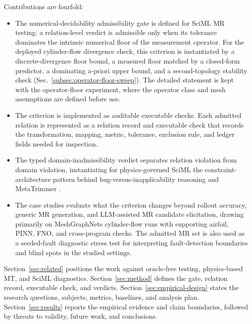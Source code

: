\documentclass[preprint,12pt]{elsarticle}
\begin{document}
Contributions are fourfold:
\begin{itemize}[leftmargin=*]
\item The numerical-decidability admissibility gate is defined for SciML MR testing: a relation-level verdict is admissible only when its tolerance dominates the intrinsic numerical floor of the measurement operator. For the deployed cylinder-flow divergence check, this criterion is instantiated by a discrete-divergence floor bound, a measured floor matched by a closed-form predictor, a dominating a-priori upper bound, and a second-topology stability check (Sec.~\ref{subsec:operator-floor-sweep}). The detailed statement is kept with the operator-floor experiment, where the operator class and mesh assumptions are defined before use.

\item The criterion is implemented as auditable executable checks. Each admitted relation is represented as a relation record and executable check that records the transformation, mapping, metric, tolerance, exclusion rule, and ledger fields needed for inspection.

\item The typed domain-inadmissibility verdict separates relation violation from domain violation, instantiating for physics-governed SciML the constraint-architecture pattern behind bug-versus-inapplicability reasoning \citep{duqueTorres2023bugornot,duqueTorres2023completePipeline} and MetaTrimmer \citep{duqueTorres2023metaTrimmer}.

\item The case studies evaluate what the criterion changes beyond rollout accuracy, generic MR generation, and LLM-assisted MR candidate elicitation, drawing primarily on MeshGraphNets cylinder-flow runs with supporting airfoil, PINN, FNO, and cross-program checks. The admitted MR set is also used as a seeded-fault diagnostic stress test for interpreting fault-detection boundaries and blind spots in the studied settings.
\end{itemize}

Section~\ref{sec:related} positions the work against oracle-free testing, physics-based MT, and SciML diagnostics. Section~\ref{sec:method} defines the gate, relation record, executable check, and verdicts. Section~\ref{sec:empirical-design} states the research questions, subjects, metrics, baselines, and analysis plan. Section~\ref{sec:results} reports the empirical evidence and claim boundaries, followed by threats to validity, future work, and conclusions.
\end{document}
